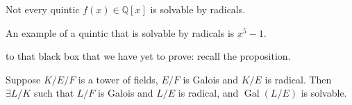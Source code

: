 \documentclass[notoc,notitlepage,nobib]{tufte-book}
\DeclareMathOperator{\Gal}{Gal}
\begin{document}
\begin{thm}\label{thm:insolvability_of_the_quintics}
  Not every quintic $f(x) \in \mathbb{Q}[x]$ is solvable by radicals.
\end{thm}

\begin{eg}
  An example of a quintic that is solvable by radicals is $x^5 - 1$.
\end{eg}

 to that black box that we have yet to prove: recall the
proposition.

\begin{propo}\label{propo:a_higher_extension_that_is_both_galois_and_radical}
  Suppose $K / E / F$ is a tower of fields, $E / F$ is Galois and $K / E$ is
  radical. Then $\exists L / K$ such that $L / F$ is Galois and $L / E$ is
  radical, and $\Gal(L / E)$ is solvable.
\end{propo}
\end{document}

